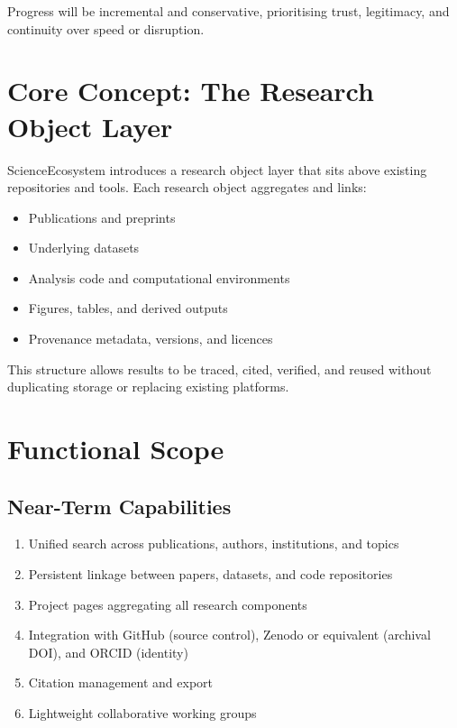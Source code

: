 \documentclass[11pt,a4paper]{article}
\begin{document}
Progress will be incremental and conservative, prioritising trust, legitimacy, and continuity over speed or disruption.

\section{Core Concept: The Research Object Layer}

ScienceEcosystem introduces a research object layer that sits above existing repositories and tools. Each research object aggregates and links:
\begin{itemize}
    \item Publications and preprints
    \item Underlying datasets
    \item Analysis code and computational environments
    \item Figures, tables, and derived outputs
    \item Provenance metadata, versions, and licences
\end{itemize}

This structure allows results to be traced, cited, verified, and reused without duplicating storage or replacing existing platforms.

\section{Functional Scope}

\subsection*{Near-Term Capabilities}
\begin{enumerate}
    \item Unified search across publications, authors, institutions, and topics
    \item Persistent linkage between papers, datasets, and code repositories
    \item Project pages aggregating all research components
    \item Integration with GitHub (source control), Zenodo or equivalent (archival DOI), and ORCID (identity)
    \item Citation management and export
    \item Lightweight collaborative working groups
\end{enumerate}
\end{document}
